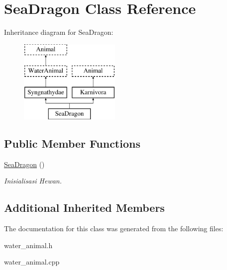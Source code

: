 \hypertarget{class_sea_dragon}{}\section{Sea\+Dragon Class Reference}
\label{class_sea_dragon}
Inheritance diagram for Sea\+Dragon\+:\begin{figure}[H]
\begin{center}
\leavevmode
\includegraphics[height=4.000000cm]{class_sea_dragon}
\end{center}
\end{figure}
\subsection*{Public Member Functions}
\begin{DoxyCompactItemize}
\item 
\hyperlink{class_sea_dragon_a87c431ca8f3a6449abac5a55df87349b}{Sea\+Dragon} ()\hypertarget{class_sea_dragon_a87c431ca8f3a6449abac5a55df87349b}{}\label{class_sea_dragon_a87c431ca8f3a6449abac5a55df87349b}

\begin{DoxyCompactList}\small\item\em Inisialisasi Hewan. \end{DoxyCompactList}\end{DoxyCompactItemize}
\subsection*{Additional Inherited Members}


The documentation for this class was generated from the following files\+:\begin{DoxyCompactItemize}
\item 
water\+\_\+animal.\+h\item 
water\+\_\+animal.\+cpp\end{DoxyCompactItemize}
